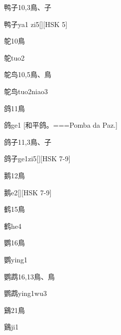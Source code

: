 \begin{Entry}{鸭子}{10,3}{⿃、⼦}
  \begin{Phonetics}{鸭子}{ya1 zi5}[][HSK 5]
  \end{Phonetics}
\end{Entry}

\begin{Entry}{鸵}{10}{⿃}
  \begin{Phonetics}{鸵}{tuo2}
  \end{Phonetics}
\end{Entry}

\begin{Entry}{鸵鸟}{10,5}{⿃、⿃}
  \begin{Phonetics}{鸵鸟}{tuo2niao3}
  \end{Phonetics}
\end{Entry}

\begin{Entry}{鸽}{11}{⿃}
  \begin{Phonetics}{鸽}{ge1}
    [和平鸽。===Pomba da Paz.]
  \end{Phonetics}
\end{Entry}

\begin{Entry}{鸽子}{11,3}{⿃、⼦}
  \begin{Phonetics}{鸽子}{ge1zi5}[][HSK 7-9]
  \end{Phonetics}
\end{Entry}

\begin{Entry}{鹅}{12}{⿃}
  \begin{Phonetics}{鹅}{e2}[][HSK 7-9]
  \end{Phonetics}
\end{Entry}

\begin{Entry}{鹤}{15}{⿃}
  \begin{Phonetics}{鹤}{he4}
  \end{Phonetics}
\end{Entry}

\begin{Entry}{鹦}{16}{⿃}
  \begin{Phonetics}{鹦}{ying1}
  \end{Phonetics}
\end{Entry}

\begin{Entry}{鹦鹉}{16,13}{⿃、⿃}
  \begin{Phonetics}{鹦鹉}{ying1wu3}
  \end{Phonetics}
\end{Entry}

\begin{Entry}{鷄}{21}{⿃}
  \begin{Phonetics}{鷄}{ji1}
  \end{Phonetics}
\end{Entry}


